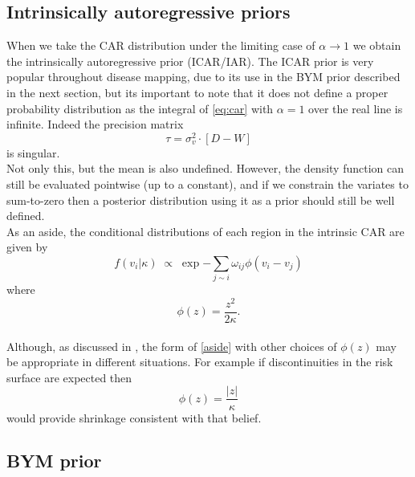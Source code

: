 \documentclass[11pt]{report}
\begin{document}
\subsection{Intrinsically autoregressive priors}

When we take the CAR distribution under the limiting case of $\alpha \to 1$ we obtain the intrinsically autoregressive prior (ICAR/IAR). The ICAR prior is very popular throughout disease mapping, due to its use in the BYM prior described in the next section, but its important to note that it does not define a proper probability distribution as the integral of \ref{eq:car} with $\alpha = 1$ over the real line is infinite. Indeed the precision matrix
\begin{equation}
\tau = \sigma_v^2 \cdot [D - W]
\end{equation}
is singular. \\

Not only this, but the mean is also undefined. However, the density function can still be evaluated pointwise (up to a constant), and if we constrain the variates to sum-to-zero then a posterior distribution using it as a prior should still be well defined. \\

As an aside, the conditional distributions of each region in the intrinsic CAR are given by
\begin{equation} \label{aside}
f(v_i | \kappa) \; \propto \; \exp{- \sum_{j \sim i} \omega_{ij} \phi(v_i - v_j)}
\end{equation}
where
\begin{equation*}
\phi(z) = \frac{z^2}{2\kappa}.
\end{equation*} \\

Although, as discussed in \citet{bym}, the form of \ref{aside} with other choices of $\phi(z)$ may be appropriate in different situations. For example if discontinuities in the risk surface are expected then
\begin{equation*}
\phi(z) = \frac{|z|}{\kappa}
\end{equation*}
would provide shrinkage consistent with that belief.

\subsection{BYM prior} \label{bym}
\end{document}
